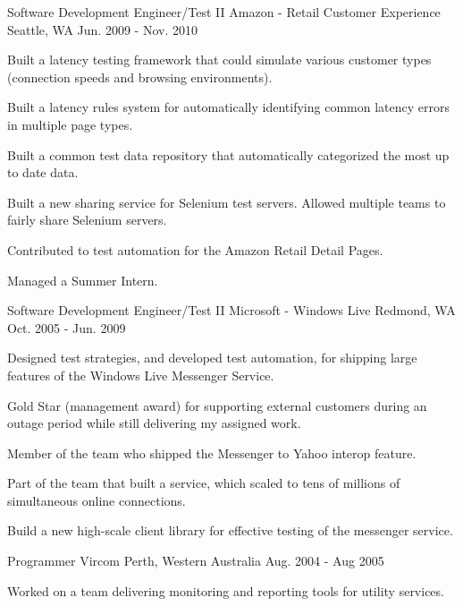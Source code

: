 \begin{cventries}
  \cventry
    {Software Development Engineer/Test II} %
    {Amazon - Retail Customer Experience} %
    {Seattle, WA} %
    {Jun. 2009 - Nov. 2010} %
    {
      \begin{cvitems} %
        \item {Built a latency testing framework that could simulate various customer types (connection speeds and browsing environments).}
        \item {Built a latency rules system for automatically identifying common latency errors in multiple page types.}
        \item {Built a common test data repository that automatically categorized the most up to date data.}
        \item {Built a new sharing service for Selenium test servers. Allowed multiple teams to fairly share Selenium servers.}
        \item {Contributed to test automation for the Amazon Retail Detail Pages.}
        \item {Managed a Summer Intern.}
      \end{cvitems}
    }

  \cventry
    {Software Development Engineer/Test II} %
    {Microsoft - Windows Live} %
    {Redmond, WA} %
    {Oct. 2005 - Jun. 2009} %
    {
      \begin{cvitems} %
        \item {Designed test strategies, and developed test automation, for shipping large features of the Windows Live Messenger Service.}
        \item {Gold Star (management award) for supporting external customers during an outage period while still delivering my assigned work.}
        \item {Member of the team who shipped the Messenger to Yahoo interop feature.}
        \item {Part of the team that built a service, which scaled to tens of millions of simultaneous online connections.}
        \item {Build a new high-scale client library for effective testing of the messenger service.}
      \end{cvitems}
    }

  \cventry
    {Programmer}
    {Vircom}
    {Perth, Western Australia}
    {Aug. 2004 - Aug 2005}
    {
      \begin{cvitems}
        \item {Worked on a team delivering monitoring and reporting tools for utility services.}
      \end{cvitems}
    }


\end{cventries}
